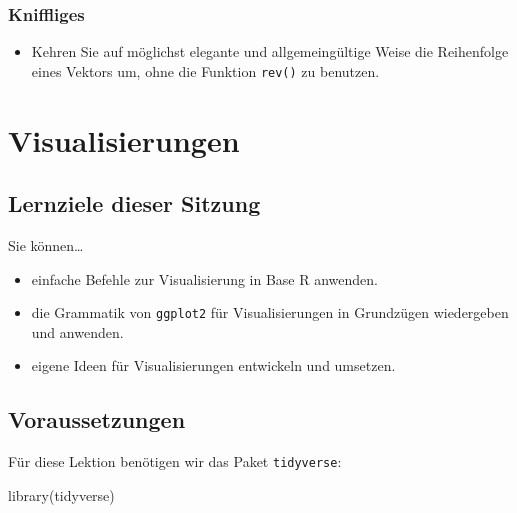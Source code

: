 \documentclass[11pt,german,a4paper]{article}
\newenvironment{Shaded}{\begin{snugshade}}{\end{snugshade}}
\newcommand{\FunctionTok}[1]{\textcolor[rgb]{0.00,0.00,0.00}{#1}}
\newcommand{\NormalTok}[1]{#1}
\providecommand{\tightlist}{%
  \setlength{\itemsep}{0pt}\setlength{\parskip}{0pt}}
\begin{document}
\hypertarget{kniffliges-1}{%
\subsubsection{Kniffliges}\label{kniffliges-1}}

\begin{itemize}
\tightlist
\item
  Kehren Sie auf möglichst elegante und allgemeingültige Weise die Reihenfolge eines Vektors um, ohne die Funktion \texttt{rev()} zu benutzen.
\end{itemize}

\hypertarget{visualisierungen}{%
\section{Visualisierungen}\label{visualisierungen}}

\hypertarget{lernziele-dieser-sitzung-1}{%
\subsection*{Lernziele dieser Sitzung}\label{lernziele-dieser-sitzung-1}}

Sie können\ldots{}

\begin{itemize}
\tightlist
\item
  einfache Befehle zur Visualisierung in Base R anwenden.
\item
  die Grammatik von \texttt{ggplot2} für Visualisierungen in Grundzügen wiedergeben und anwenden.
\item
  eigene Ideen für Visualisierungen entwickeln und umsetzen.
\end{itemize}

\hypertarget{voraussetzungen}{%
\subsection*{Voraussetzungen}\label{voraussetzungen}}

Für diese Lektion benötigen wir das Paket \texttt{tidyverse}:

\begin{Shaded}
\begin{Highlighting}[]
\FunctionTok{library}\NormalTok{(tidyverse)}
\end{Highlighting}
\end{Shaded}
\end{document}

